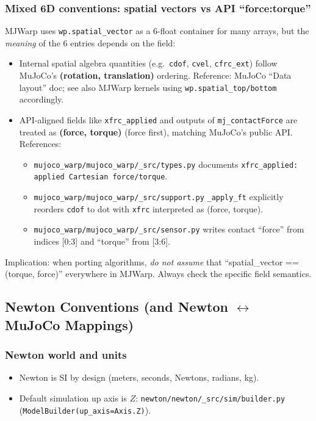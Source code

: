 \subsubsection{Mixed 6D conventions: spatial vectors vs API ``force:torque''}
MJWarp uses \texttt{wp.spatial\_vector} as a 6-float container for many arrays, but the \emph{meaning} of the 6 entries
depends on the field:
\begin{itemize}
  \item Internal spatial algebra quantities (e.g.\ \texttt{cdof}, \texttt{cvel}, \texttt{cfrc\_ext}) follow MuJoCo's
        \textbf{(rotation, translation)} ordering.
        Reference: MuJoCo ``Data layout'' doc; see also MJWarp kernels using \texttt{wp.spatial\_top/bottom} accordingly.
  \item API-aligned fields like \texttt{xfrc\_applied} and outputs of \texttt{mj\_contactForce} are treated as
        \textbf{(force, torque)} (force first), matching MuJoCo's public API.
        References:
        \begin{itemize}
          \item \texttt{mujoco\_warp/mujoco\_warp/\_src/types.py} documents \texttt{xfrc\_applied: applied Cartesian force/torque}.
          \item \texttt{mujoco\_warp/mujoco\_warp/\_src/support.py} \texttt{\_apply\_ft} explicitly reorders \texttt{cdof} to dot with
                \texttt{xfrc} interpreted as (force, torque).
          \item \texttt{mujoco\_warp/mujoco\_warp/\_src/sensor.py} writes contact ``force'' from indices [0:3] and ``torque'' from [3:6].
        \end{itemize}
\end{itemize}
\noindent
Implication: when porting algorithms, \emph{do not assume} that ``spatial\_vector == (torque, force)'' everywhere in MJWarp.
Always check the specific field semantics.

\subsection{Newton Conventions (and Newton $\leftrightarrow$ MuJoCo Mappings)}

\subsubsection{Newton world and units}
\begin{itemize}
  \item Newton is SI by design (meters, seconds, Newtons, radians, kg).
  \item Default simulation up axis is \textbf{$Z$}: \texttt{newton/newton/\_src/sim/builder.py} (\texttt{ModelBuilder(up\_axis=Axis.Z)}).
\end{itemize}

